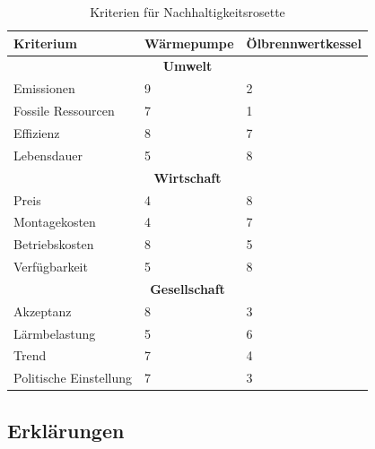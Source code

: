\begin{table}
\begin{center}
\begin{tabular}[c]{|p{}|p{}|p{}|}

  \hline
  \textbf{Kriterium} &
  \textbf{Wärmepumpe} &
  \textbf{Ölbrennwertkessel} \\ \hline

  \multicolumn{3}{|c|}{\textbf{Umwelt}} \\ \hline
  
  Emissionen
  & 9 & 2 \\
  Fossile Ressourcen
  & 7 & 1 \\
  Effizienz
  & 8 & 7 \\
  Lebensdauer
  & 5 & 8 \\
  \hline
  
  \multicolumn{3}{|c|}{\textbf{Wirtschaft}} \\ \hline
  
  Preis
  & 4 & 8 \\
  Montagekosten
  & 4 & 7 \\
  Betriebskosten
  & 8 & 5 \\
  Verfügbarkeit
  & 5 & 8 \\
  \hline

  \multicolumn{3}{|c|}{\textbf{Gesellschaft}} \\ \hline

  Akzeptanz
  & 8 & 3 \\
  Lärmbelastung
  & 5 & 6 \\
  Trend
  & 7 & 4 \\
  Politische Einstellung
  & 7 & 3 \\
  \hline

\end{tabular}
\end{center}
\caption{Kriterien für Nachhaltigkeitsrosette}
\end{table}

\subsection{Erklärungen}

